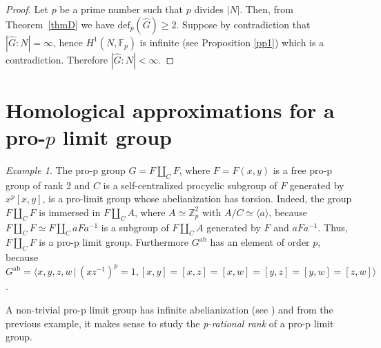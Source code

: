 \documentclass[10pt]{amsart}
\theoremstyle{plain}
\theoremstyle{definition}
\theoremstyle{remark}
\newtheorem{example}{Example}
\numberwithin{prop}{section}
\numberwithin{example}{section}
\numberwithin{equation}{section}
\newcommand{\Z}{\mathbb{Z}}
\newcommand{\F}{\mathbb{F}}
\newcommand{\de}{\mathrm{def}}
\newcommand{\ab}{\mathrm{ab}}
\begin{document}
	\begin{proof} 
		Let $p$ be a prime number such that $p$ divides $|N|$. Then, from Theorem~\ref{thmD} we have $\de_p(\widehat{G})\geq 2$. Suppose by contradiction that   $|\widehat{G}:N|=\infty$, hence       $H^1(N,\F_p)$ is  infinite  (see Proposition \ref{pp1}) which is a contradiction. Therefore  $|\widehat{G}:N|<\infty$. 
	\end{proof}
	
\section{Homological approximations for a pro-$p$ limit group}
\begin{example}
The pro-p group $G=F\amalg_C F$, where  $F=F(x,y)$ is a free  pro-p group of rank 2 and $C$ is a self-centralized procyclic subgroup of $F$ generated by $x^p[x,y]$, is a pro-limit group whose abelianization has torsion. Indeed, the group  $F\amalg_C F$ is immersed in  $F\amalg_C A$, where  $A\simeq \Z_p^2$ with $A/C\simeq \langle a \rangle$, because  $F\amalg_C F\simeq F\amalg_C aFa^{-1}$  is a subgroup of $F\amalg_C A$  generated by $F$ and  $aFa^{-1}$. Thus,  $F\amalg_C F$ is a pro-p limit group. Furthermore  $G^{\ab}$  has an element of order $p$, because  $G^{\ab}=\langle x,y,z,w\,|\,(xz^{-1})^p=1,[x,y]=[x,z]=[x,w]=[y,z]=[y,w]=[z,w] \rangle$. 
	\end{example}

   A  non-trivial pro-p limit group   has infinite abelianization  (see \cite[\S 4, Cor. 4.5]{AD})  and from the previous example, it makes sense to study the \textit{p-rational rank } of a pro-p limit group. 
	
\end{document}
